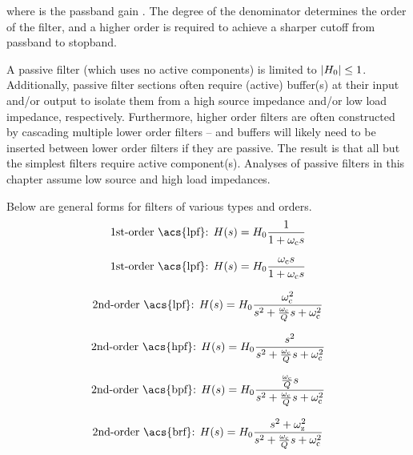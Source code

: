 where \Hpass is the passband gain \autocite[8.5]{basic-linear-design-adi}.
The degree of the denominator determines the order of the filter, and a higher order is required to achieve a sharper cutoff from passband to stopband.

A passive filter (which uses no active components) is limited to \(\left|H_0\right| \leq 1\).
Additionally, passive filter sections often require (active) buffer(s) at their input and/or output to isolate them from a high source impedance and/or low load impedance, respectively.
Furthermore, higher order filters are often constructed by cascading multiple lower order filters -- and buffers will likely need to be inserted between lower order filters if they are passive.
The result is that all but the simplest filters require active component(s).
Analyses of passive filters in this chapter assume low source and high load impedances.

Below are general forms for filters of various types and orders.
\begin{equation}
	\text{1st-order \acs{lpf}: }\Hs = \Hpass\frac{1}{1 + \wcutoff s}
	\label{eq:1storderLPF}
\end{equation}

\begin{equation}
	\text{1st-order \acs{lpf}: }\Hs = \Hpass\frac{\wcutoff s}{1 + \wcutoff s}
	\label{eq:1storderHPF}
\end{equation}

\begin{equation}
	\text{2nd-order \acs{lpf}: }\Hs = \Hpass \frac{\wcutoff^2}{s^2 + \frac{\wcutoff}{Q}s + \wcutoff^2}
	\label{eq:2ndorderLPF}
\end{equation}

\begin{equation}
	\text{2nd-order \acs{hpf}: }\Hs = \Hpass \frac{s^2}{s^2 + \frac{\wcutoff}{Q}s + \wcutoff^2}
	\label{eq:2ndorderHPF}
\end{equation}

\begin{equation}
	\text{2nd-order \acs{bpf}: }\Hs = \Hpass \frac{\frac{\wcutoff}{Q}s}{s^2 + \frac{\wcutoff}{Q}s + \wcutoff^2}
	\label{eq:2ndorderBPF}
\end{equation}

\begin{equation}
	\text{2nd-order \acs{brf}: }\Hs = \Hpass \frac{s^2 + \w[z]^2}{s^2 + \frac{\wcutoff}{Q}s + \wcutoff^2}
	\label{eq:2ndorderBRF}
\end{equation}

